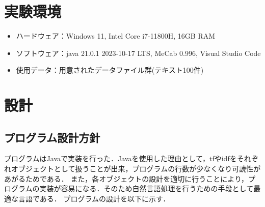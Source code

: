 \documentclass[a4paper,11pt]{ltjsarticle}
\begin{document}
\section{実験環境}
\begin{itemize}
    \item ハードウェア：Windows 11, Intel Core i7-11800H, 16GB RAM
    \item ソフトウェア：java 21.0.1 2023-10-17 LTS, MeCab 0.996, Visual Studio Code
    \item 使用データ：用意されたデータファイル群(テキスト100件)
\end{itemize}

\section{設計}
\subsection{プログラム設計方針}
プログラムはJavaで実装を行った．Javaを使用した理由として，tfやidfをそれぞれオブジェクトとして扱うことが出来，プログラムの行数が少なくなり可読性があがるためである．
また，各オブジェクトの設計を適切に行うことにより，プログラムの実装が容易になる．そのため自然言語処理を行うための手段として最適な言語である．
プログラムの設計を以下に示す．
\end{document}
